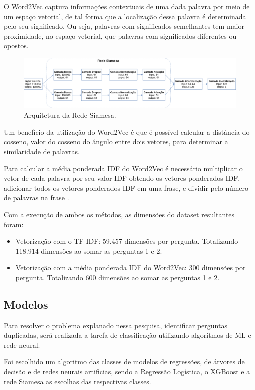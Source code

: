 \documentclass[conference]{IEEEtran}
\begin{document}
O Word2Vec captura informações contextuais de uma dada palavra por meio de um espaço vetorial, de tal forma que a localização dessa palavra é determinada pelo seu significado. Ou seja, palavras com significados semelhantes tem maior proximidade, no espaço vetorial, que palavras com significados diferentes ou opostos.

\begin{figure}[htbp]
  \includegraphics[width=\textwidth]{rede_siamesa.png}
  \caption{Arquitetura da Rede Siamesa.}
\end{figure}

Um benefício da utilização do Word2Vec é que é possível calcular a distância do cosseno, valor do cosseno do ângulo entre dois vetores, para determinar a similaridade de palavras.

Para calcular a média ponderada IDF do Word2Vec é necessário multiplicar o vetor de cada palavra por seu valor IDF obtendo os vetores ponderados IDF, adicionar todos os vetores ponderados IDF em uma frase, e dividir pelo número de palavras na frase \cite{Dja2019}.

Com a execução de ambos os métodos, as dimensões do dataset resultantes foram:
\begin{itemize}
    \item Vetorização com o TF-IDF: 59.457 dimensões por pergunta. Totalizando 118.914 dimensões ao somar as perguntas 1 e 2.
    \item Vetorização com a média ponderada IDF do Word2Vec: 300 dimensões por pergunta. Totalizando 600 dimensões ao somar as perguntas 1 e 2.
\end{itemize}

\subsection{Modelos}

Para resolver o problema explanado nessa pesquisa, identificar perguntas duplicadas, será realizada a tarefa de classificação utilizando algoritmos de ML e rede neural. 

Foi escolhido um algoritmo das classes de modelos de regressões, de árvores de decisão e de redes neurais artificias, sendo a Regressão Logística, o XGBoost e a rede Siamesa as escolhas das respectivas classes.
\end{document}
